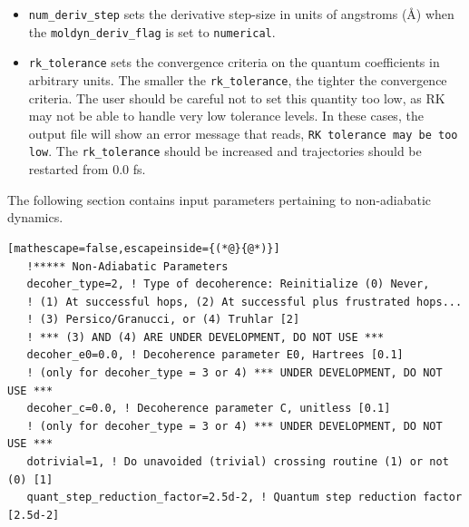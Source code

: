 \documentclass[letterpaper,12pt,titlepage]{article}
\begin{document}
\begin{itemize}
\item \verb+num_deriv_step+ sets the derivative step-size in units of angstroms (\AA) when the \verb+moldyn_deriv_flag+ is set to \verb+numerical+.
\item \verb+rk_tolerance+ sets the convergence criteria on the quantum coefficients in arbitrary units.  The smaller the \verb+rk_tolerance+, the tighter the convergence criteria.  The user should be careful not to set this quantity too low, as RK may not be able to handle very low tolerance levels.  In these cases, the output file will show an error message that reads, \verb+RK tolerance may be too low+.  The \verb+rk_tolerance+ should be increased and trajectories should be restarted from 0.0 fs.
\end{itemize}

The following section contains input parameters pertaining to non-adiabatic dynamics.
\begin{lstlisting}[mathescape=false,escapeinside={(*@}{@*)}]
   !***** Non-Adiabatic Parameters
   decoher_type=2, ! Type of decoherence: Reinitialize (0) Never, 
   ! (1) At successful hops, (2) At successful plus frustrated hops... 
   ! (3) Persico/Granucci, or (4) Truhlar [2]
   ! *** (3) AND (4) ARE UNDER DEVELOPMENT, DO NOT USE ***
   decoher_e0=0.0, ! Decoherence parameter E0, Hartrees [0.1]
   ! (only for decoher_type = 3 or 4) *** UNDER DEVELOPMENT, DO NOT USE ***
   decoher_c=0.0, ! Decoherence parameter C, unitless [0.1]
   ! (only for decoher_type = 3 or 4) *** UNDER DEVELOPMENT, DO NOT USE ***
   dotrivial=1, ! Do unavoided (trivial) crossing routine (1) or not (0) [1]
   quant_step_reduction_factor=2.5d-2, ! Quantum step reduction factor [2.5d-2]
\end{lstlisting}
\end{document}
